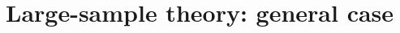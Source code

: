 \documentclass[11pt]{article}
\theoremstyle{definition}
\begin{document}
 


 

 
 



 \section{Large-sample theory: general case}
\label{section::theory}
 
\end{document}
